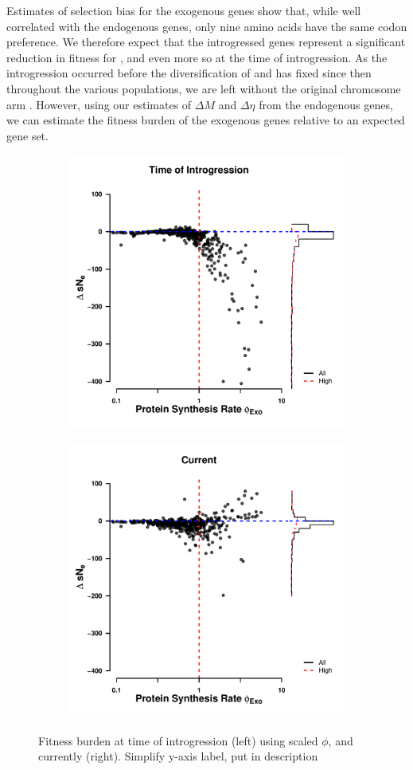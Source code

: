 \documentclass[12pt]{article}
\begin{document}
Estimates of selection bias for the exogenous genes show that, while well correlated with the endogenous genes, only nine amino acids have the same codon preference.
We therefore expect that the introgressed genes represent a significant reduction in fitness for \kluyveri, and even more so at the time of introgression.
As the introgression occurred before the diversification of \kluyveri and has fixed since then throughout the various populations, we are left without the original chromosome arm \citep{friedrich2015}.
However, using our estimates of $\Delta M$ and $\Delta \eta$ from the endogenous genes, we can estimate the fitness burden of the exogenous genes relative to an expected gene set.
\begin{figure}[h]
    \centering
    \begin{subfigure}
        \centering
        \includegraphics[width=.45\textwidth]{img/fitness_difference_gos_kappa5.pdf}
    \end{subfigure}
    \begin{subfigure}
        \centering
        \includegraphics[width=.45\textwidth]{img/fitness_difference_exo.pdf}
    \end{subfigure}
    \caption{Fitness burden at time of introgression (left) using scaled $\phi$, and currently (right). Simplify y-axis label, put in description}
    \label{fig:sne_fitness_burden}
\end{figure}
\end{document}

